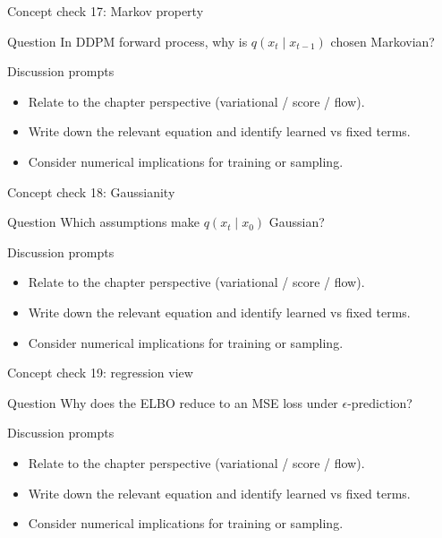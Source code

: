 \documentclass[aspectratio=169]{beamer}
\begin{document}
\begin{frame}{Concept check 17: Markov property}
\begin{block}{Question}
In DDPM forward process, why is \(q(x_t\mid x_{t-1})\) chosen Markovian?
\end{block}
\begin{block}{Discussion prompts}
\begin{itemize}
\item Relate to the chapter perspective (variational / score / flow).
\item Write down the relevant equation and identify learned vs fixed terms.
\item Consider numerical implications for training or sampling.
\end{itemize}
\end{block}
\end{frame}

\begin{frame}{Concept check 18: Gaussianity}
\begin{block}{Question}
Which assumptions make \(q(x_t\mid x_0)\) Gaussian?
\end{block}
\begin{block}{Discussion prompts}
\begin{itemize}
\item Relate to the chapter perspective (variational / score / flow).
\item Write down the relevant equation and identify learned vs fixed terms.
\item Consider numerical implications for training or sampling.
\end{itemize}
\end{block}
\end{frame}

\begin{frame}{Concept check 19: regression view}
\begin{block}{Question}
Why does the ELBO reduce to an MSE loss under \(\epsilon\)-prediction?
\end{block}
\begin{block}{Discussion prompts}
\begin{itemize}
\item Relate to the chapter perspective (variational / score / flow).
\item Write down the relevant equation and identify learned vs fixed terms.
\item Consider numerical implications for training or sampling.
\end{itemize}
\end{block}
\end{frame}
\end{document}
